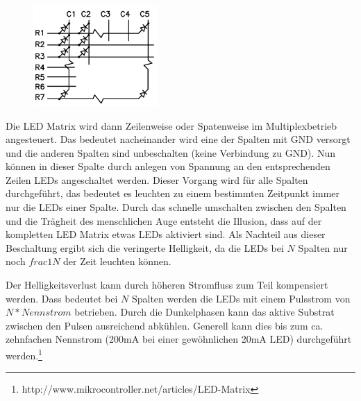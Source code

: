 \begin{figure}
  \vspace{-25pt}
  \begin{center}
    \includegraphics[width=0.42\textwidth]{skizzen/led_matrix_5x7.png}
  \end{center}
  \vspace{-20pt}
\end{figure}

Die LED Matrix
wird dann Zeilenweise oder Spatenweise im Multiplexbetrieb angesteuert. Das bedeutet nacheinander wird eine der Spalten mit GND versorgt und die anderen Spalten sind unbeschalten (keine Verbindung zu GND). Nun können in dieser Spalte durch anlegen von Spannung an den entsprechenden Zeilen LEDs angeschaltet werden. 
Dieser Vorgang wird für alle Spalten durchgeführt, das bedeutet es leuchten zu
einem bestimmten Zeitpunkt immer nur die LEDs einer Spalte. Durch das schnelle
umschalten zwischen den Spalten und die Trägheit des menschlichen Auge entsteht
die Illusion, dass auf der kompletten LED Matrix etwas LEDs aktiviert sind.
Als Nachteil aus dieser Beschaltung ergibt sich die veringerte Helligkeit, da
die LEDs bei $N$ Spalten nur noch $frac{1}{N}$ der Zeit leuchten können.

Der Helligkeitsverlust kann durch höheren Stromfluss zum Teil kompensiert
werden. Dass bedeutet bei $N$ Spalten werden die LEDs mit einem Pulsstrom von
$N*Nennstrom$ betrieben. Durch die Dunkelphasen kann das aktive Substrat
zwischen den Pulsen ausreichend abkühlen. Generell kann dies bis zum ca.
zehnfachen Nennstrom (200mA bei einer gewöhnlichen 20mA LED) durchgeführt
werden.\footnote{http://www.mikrocontroller.net/articles/LED-Matrix}

